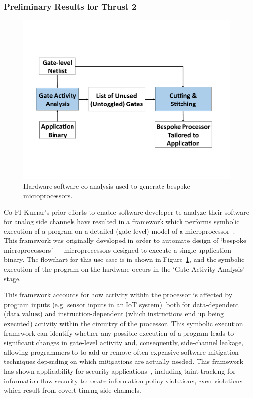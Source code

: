 \subsubsection{Preliminary Results for Thrust 2}

\begin{figure}
\includegraphics[width=\linewidth]{./figure/Bespoke_Flow_Fig.pdf}
\caption{\small
    Hardware-software co-analysis used to generate bespoke microprocessors.}
\label{fig:bespoke}
\end{figure}
Co-PI Kumar's prior efforts to enable software developer to analyze their software for analog side channels have resulted in a framework which performs symbolic execution of a program on a detailed (gate-level) model of a microprocessor~\cite{cherupalli2017}.
This framework was originally developed in order to automate design of `bespoke microprocessors' --- microprocessors designed to execute a single application binary.
The flowchart for this use case is in shown in Figure~\ref{fig:bespoke}, and the symbolic execution of the program on the hardware occurs in the `Gate Activity Analysis' stage.

This framework accounts for how activity within the processor is affected by program inputs (e.g. sensor inputs in an IoT system), both for data-dependent (data values) and instruction-dependent (which instructions end up being executed) activity within the circuitry of the processor. This symbolic execution framework can identify whether any possible execution of a program leads to significant changes in gate-level activity and, consequently, side-channel leakage, allowing programmers to to add or remove often-expensive software mitigation techniques depending on which mitigations are actually needed. This framework has shown applicability for security applications~\cite{cherupalli20172}, including
taint-tracking for information flow security to locate information policy
violations, even violations which result from covert timing side-channels.

